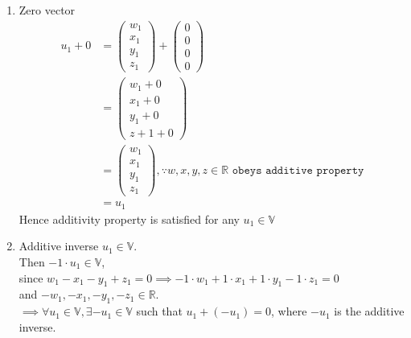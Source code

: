 \documentclass[12pt,letterpaper,fleqn]{article}
\theoremstyle{definition}
\begin{document}
\begin{enumerate}
\item Zero vector
\begin{equation*}
\begin{split}
u_1 + 0 &= \begin{pmatrix}
w_1\\
x_1\\
y_1\\
z_1
\end{pmatrix} + 
\begin{pmatrix}
0\\
0\\
0\\
0
\end{pmatrix}\\
&= \begin{pmatrix}
w_1 + 0\\
x_1 + 0\\
y_1 + 0\\
z+1 + 0
\end{pmatrix}\\
&= \begin{pmatrix}
w_1\\
x_1\\
y_1\\
z_1
\end{pmatrix}, \because w,x,y,z \in \mathbb{R} \texttt{ obeys additive property}\\
&= u_1
\end{split}
\end{equation*}
Hence additivity property is satisfied for any $u_1 \in \mathbb{V}$

\item Additive inverse
$u_1 \in \mathbb{V}$.\\
 Then $ -1 \cdot u_1 \in \mathbb{V}$,\\
  since $ w_1 - x_1 - y_1 + z_1 = 0 \implies -1 \cdot w_1 + 1 \cdot x_1 + 1 \cdot y_1 - 1 \cdot z_1 = 0$\\
   and $ -w_1, -x_1, -y_1, -z_1 \in \mathbb{R}$.\\
   $\implies \forall u_1 \in \mathbb{V}, \exists -u_1 \in \mathbb{V}$ such that $ u_1  + (-u_1) = 0$, where $-u_1$ is the additive inverse.


\end{enumerate}
\end{document}
